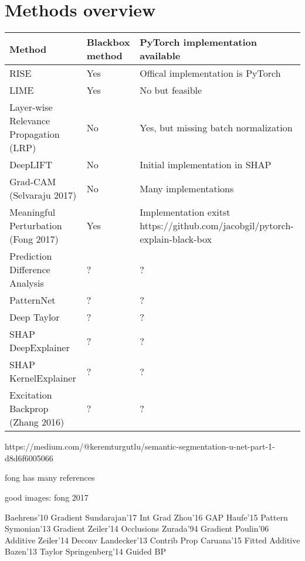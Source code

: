 \section{Methods overview}

\begin{tabular}{| p{7cm} | p{2.5cm} | p{6cm} | }
\hline
\textbf{Method} & \textbf{Blackbox method} & \textbf{PyTorch implementation available} \\ \hline

RISE\cite{Petsiuk2018rise} & Yes & Offical implementation is PyTorch \\ \hline
LIME\cite{ribeiro2016should} & Yes & No but feasible \\ \hline
Layer-wise Relevance Propagation (LRP) & No & Yes, but missing batch normalization\cite{lrppytorch} \\ \hline
DeepLIFT & No & Initial implementation in SHAP\cite{NIPS2017_7062} \\ \hline
Grad-CAM (Selvaraju 2017) & No & Many implementations \\ \hline
Meaningful Perturbation (Fong 2017)\cite{todo} & Yes & Implementation exitst \cite{todo} https://github.com/jacobgil/pytorch-explain-black-box \\ \hline

Prediction Difference Analysis \cite{todo} & ? & ? \\ \hline
PatternNet & ? & ? \\ \hline
Deep Taylor & ? & ? \\ \hline
SHAP DeepExplainer\cite{NIPS2017_7062} & ? & ? \\ \hline
SHAP KernelExplainer\cite{NIPS2017_7062} & ? & ? \\ \hline
Excitation Backprop (Zhang 2016)\cite{todo}  & ? & ? \\ \hline

\end{tabular}



https://medium.com/@keremturgutlu/semantic-segmentation-u-net-part-1-d8d6f6005066


fong has many references

good images: fong 2017

Baehrens'10 Gradient
Sundarajan'17 Int Grad
Zhou'16 GAP
Haufe'15 Pattern
Symonian'13 Gradient
Zeiler'14 Occlusions
Zurada'94 Gradient
Poulin'06 Additive
Zeiler'14 Deconv
Landecker'13 Contrib Prop
Caruana'15 Fitted Additive
Bazen'13 Taylor
Springenberg'14 Guided BP


